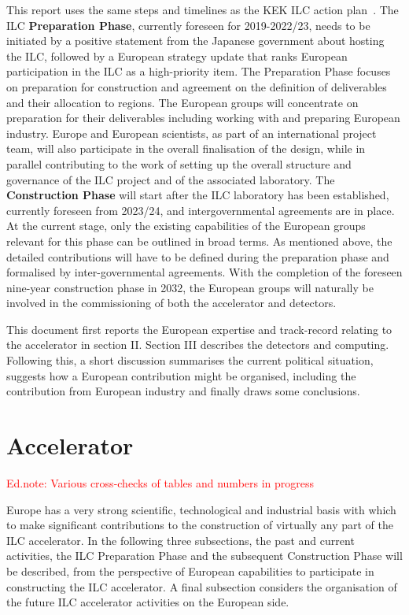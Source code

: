\documentclass[%
 reprint,
 floatfix,
 amsmath,amssymb,
 aps,
]{revtex4-1}
\newcommand{\todo}[1]{\textcolor{red}{{#1}}}
\begin{document}
This report uses the same steps and timelines as the KEK ILC action plan~\cite{kekactionplan}. The ILC \textbf{Preparation Phase}, currently foreseen for 2019-2022/23, needs to be initiated by a positive statement from the Japanese government about hosting the ILC, followed by a European strategy update that ranks European participation in the ILC as a high-priority item. The Preparation Phase focuses on preparation for construction and agreement on the definition of deliverables and their allocation to regions. The European groups will concentrate on preparation for their deliverables including working with and preparing European industry. Europe and European scientists, as part of an international project team, will also participate in the overall finalisation of the design, while in parallel contributing to the work of setting up the overall structure and governance of the ILC project and of the associated laboratory.
The \textbf{Construction Phase} will start after the ILC laboratory has been established, currently foreseen from 2023/24, and intergovernmental agreements are in place. At the current stage, only the existing capabilities of the European groups relevant for this phase can be outlined in broad terms. As mentioned above, the detailed contributions will have to be defined during the preparation phase and formalised by inter-governmental agreements.  With the completion of the foreseen nine-year construction phase in 2032, the European groups will naturally be involved in the commissioning of both the accelerator and detectors.

This document first reports the European expertise and track-record relating to the accelerator in section II. Section III describes the detectors and computing. Following this, a short discussion summarises the current political situation, suggests how a
European contribution might be organised, including the contribution from European industry and finally draws some conclusions.


\section{\label{sec:acc}Accelerator}

\todo{Ed.note: Various cross-checks of tables and numbers in progress} 

Europe has a very strong scientific, technological and industrial basis with which to make significant contributions to the construction of virtually 
any part of the ILC accelerator. In the following three subsections, the past and current activities, the ILC Preparation Phase and the subsequent Construction Phase will be described, from the perspective of European capabilities to participate in constructing the ILC accelerator. 
A final subsection considers the organisation of the future ILC accelerator activities on the European side. 
\end{document}

